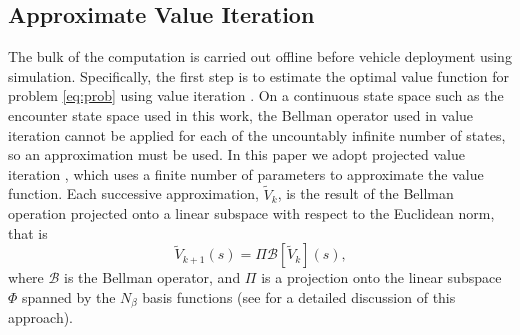\subsection{Approximate Value Iteration} \label{sec:iter}

The bulk of the computation is carried out offline before vehicle deployment using simulation. Specifically, the first step is to estimate the optimal value function for problem \eqref{eq:prob} using value iteration \cite{DB:05}. On a continuous state space such as the encounter state space used in this work, the Bellman operator used in value iteration cannot be applied for each of the uncountably infinite number of states, so an approximation must be used. In this paper we adopt projected value iteration \cite{DB:05}, which  uses a finite number of parameters to approximate the value function. Each successive approximation, $\tilde{V}_k$, is the result of the Bellman operation projected onto a linear subspace with respect to the Euclidean norm, that is
\begin{equation}\label{eqn:projvi}
    \tilde{V}_{k+1}(s) = \Pi \mathcal{B}[\tilde{V}_k](s) \text{,}
\end{equation}
where $\mathcal{B}$ is the Bellman operator, and $\Pi$ is a projection onto the linear subspace $\Phi$ spanned by the $N_\beta$ basis functions (see \cite{DB:05} for a detailed discussion of this approach).

